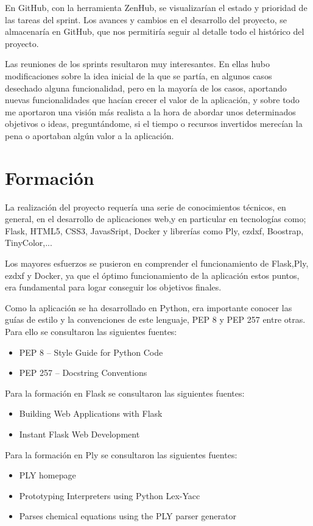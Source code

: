 En GitHub, con la herramienta ZenHub, se visualizarían el estado y prioridad de las tareas del sprint. Los avances y cambios en el desarrollo del proyecto, se almacenaría en GitHub, que nos permitiría seguir al detalle  todo el histórico del proyecto.

Las reuniones de los sprints resultaron muy interesantes. En ellas hubo modificaciones sobre la idea inicial de la que se partía, en algunos casos desechado alguna funcionalidad, pero en la mayoría de los casos, aportando nuevas funcionalidades que hacían  crecer el valor de la aplicación, y sobre todo me aportaron una visión más realista a la hora de abordar unos determinados objetivos o ideas, preguntándome, si el tiempo o recursos invertidos merecían la pena o aportaban algún valor a la aplicación.

\section{Formación}

La realización del proyecto requería una serie de conocimientos técnicos, en general, en el desarrollo de aplicaciones web,y en particular en  tecnologías como;
Flask, HTML5, CSS3, JavasSript, Docker y librerías como Ply, ezdxf, Boostrap, TinyColor,...

Los mayores esfuerzos se pusieron en comprender el funcionamiento de Flask,Ply, ezdxf y Docker, ya que el óptimo funcionamiento de la aplicación  estos puntos, era fundamental para logar conseguir los objetivos finales. 

Como la aplicación se ha desarrollado en Python, era importante conocer las guías de estilo y la convenciones de este lenguaje, PEP 8 y
PEP 257 entre otras. Para ello se consultaron las siguientes fuentes:

\begin{itemize}
\item PEP 8 -- Style Guide for Python Code \cite{PEP8}
\item PEP 257 -- Docstring Conventions \cite{PEP257}
\end{itemize}


Para la formación en Flask se consultaron las siguientes fuentes:

\begin{itemize}
\item Building Web Applications  with Flask \cite{Flask1}
\item Instant Flask Web Development \cite{Flask2}
\end{itemize}

Para la formación en Ply se consultaron las siguientes fuentes:

\begin{itemize}
\item PLY homepage \cite{HomePly}
\item Prototyping Interpreters using Python Lex-Yacc \cite{Ply2}
\item Parses chemical equations using the PLY parser generator \cite{Ply3}

\end{itemize}
